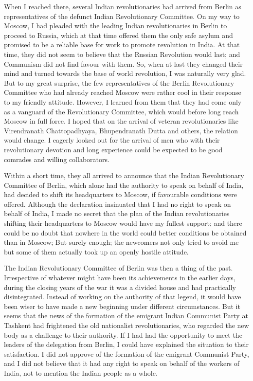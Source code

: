 When I reached there, several Indian revolutionaries had arrived from Berlin as representatives of the defunct Indian Revolutionary Committee. On my way to Moscow, I had pleaded with the leading Indian revolutionaries in Berlin to proceed to Russia, which at that time offered them the only safe asylum and promised to be a reliable base for work to promote revolution in India. At that time, they did not seem to believe that the Russian Revolution would last; and Communism did not find favour with them. So, when at last they changed their mind and turned towards the base of world revolution, I was naturally very glad. But to my great surprise, the few representatives of the Berlin Revolutionary Committee who had already reached Moscow were rather cool in their response to my friendly attitude. However, I learned from them that they had come only as a vanguard of the Revolutionary Committee, which would before long reach Moscow in full force. I hoped that on the arrival of veteran revolutionaries like Virendranath Chattopadhyaya, Bhupendranath Dutta and others, the relation would change. I eagerly looked out for the arrival of men who with their revolutionary devotion and long experience could be expected to be good comrades and willing collaborators. 

Within a short time, they all arrived to announce that the Indian Revolutionary Committee of Berlin, which alone had the authority to speak on behalf of India, had decided to shift its headquarters to Moscow, if favourable conditions were offered. Although the declaration insinuated that I had no right to speak on behalf of India, I made no secret that the plan of the Indian revolutionaries shifting their headquarters to Moscow would have my fullest support; and there could be no doubt that nowhere in the world could better conditions be obtained than in Moscow; But surely enough; the newcomers not only tried to avoid me but some of them actually took up an openly hostile attitude. 

The Indian Revolutionary Committee of Berlin was then a thing of the past. Irrespective of whatever might have been its achievements in the earlier days, during the closing years of the war it was a divided house and had practically disintegrated. Instead of working on the authority of that legend, it would have been wiser to have made a new beginning under different circumstances. But it seems that the news of the formation of the emigrant Indian Communist Party at Tashkent had frightened the old nationalist revolutionaries, who regarded the new body as a challenge to their authority. If I had had the opportunity to meet the leaders of the delegation from Berlin, I could have explained the situation to their satisfaction. I did not approve of the formation of the emigrant Communist Party, and I did not believe that it had any right to speak on behalf of the workers of India, not to mention the Indian people as a whole. 

